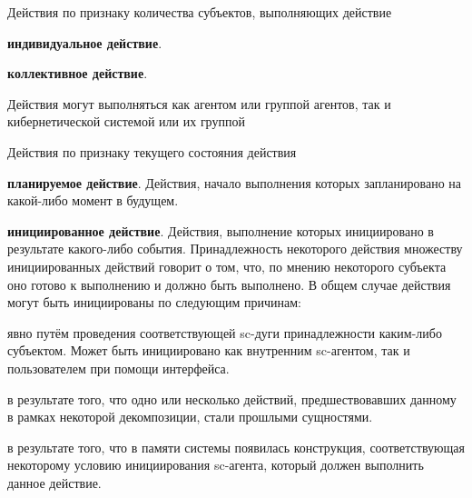 \begin{frame}{Действия по признаку количества субъектов, выполняющих действие}
    \begin{textitemize}
        \item \textbf{индивидуальное действие}.
        \item \textbf{коллективное действие}.
    \end{textitemize}
    Действия могут выполняться как агентом или группой агентов, так и кибернетической системой или их группой
\end{frame}

\begin{frame}{\large Действия по признаку текущего состояния действия}
\vspace{20}
    \begin{textitemize}
        \item \textbf{планируемое действие}. Действия, начало выполнения которых запланировано на какой-либо момент в будущем. 
        \item \textbf{инициированное действие}. Действия, выполнение которых инициировано в результате какого-либо события. Принадлежность некоторого действия множеству инициированных действий говорит о том, что, по мнению некоторого субъекта оно готово к выполнению и должно быть выполнено.  В общем случае действия могут быть инициированы по следующим причинам:
        \begin{textitemize}
            \item явно путём проведения соответствующей sc-дуги принадлежности каким-либо субъектом. Может быть инициировано как внутренним sc-агентом, так и пользователем при помощи интерфейса.
            \item в результате того, что одно или несколько действий, предшествовавших данному в рамках некоторой декомпозиции, стали прошлыми сущностями.
            \item в результате того, что в памяти системы появилась конструкция, соответствующая некоторому условию инициирования sc-агента, который должен выполнить данное действие.
        \end{textitemize}
    \end{textitemize}
\end{frame}

